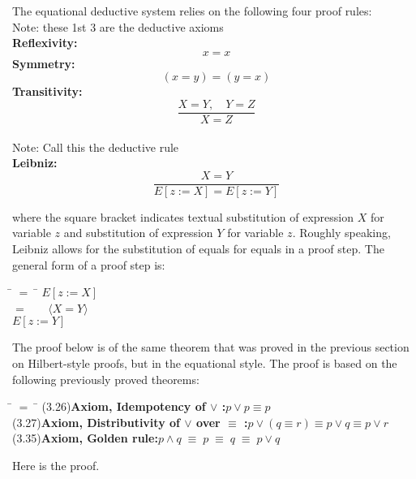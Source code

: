 \documentclass[fleqn, leqno]{article}
\newcommand{\lgap}{2pt}                             %
\newcommand{\mymathindent}{24pt}                      %
\newcommand{\equivs}{\ensuremath{\;\equiv\;}}       %
\newcommand{\Gll} {\langle}                         %
\newcommand{\Ggg} {\rangle}                         %
\newcommand{\Hint}[1]     {\ \ \ $\Gll              \mbox{#1} \Ggg$ }   %
\begin{document}
The equational deductive system relies on the following four proof rules:\\[\lgap]

Note: these 1st 3 are the deductive axioms\\
\textbf{Reflexivity:}
\[
x=x
\]
\textbf{Symmetry:}
\[
(x=y) = (y=x)
\]
\textbf{Transitivity:}
\[
\frac{X=Y, \quad Y=Z}{X=Z}
\]
\hfill\\
Note: Call this the deductive rule\\ 
\textbf{Leibniz:}
\[
\frac{X=Y}{E[z:=X]=E[z:=Y]}
\]

where the square bracket indicates textual substitution of expression $X$ for variable $z$ and substitution
of expression $Y$ for variable $z$.
Roughly speaking, Leibniz allows for the substitution of equals for equals in a proof step.
The general form of a proof step is:

\begin{tabbing}
\hspace{\mymathindent} \= $= \;$ \=  \kill
  \> \>   $E[z:=X]$\\[\lgap]
  \> $=$  \>  \Hint{$X=Y$} \\[\lgap]
  \> \>   $E[z:=Y]$
\end{tabbing}

The proof below is of the same theorem that was proved in the previous section on Hilbert-style proofs, but in the equational style.  The proof is based on the following previously proved theorems:\\

\begin{tabbing}
\hspace{\mymathindent} \= $= \;$ \=  \kill
(3.26)\>\textbf{Axiom, Idempotency of $\lor$ :}\quad $p\lor p \equiv p$\\[\lgap]
(3.27)\>\textbf{Axiom, Distributivity of $\lor$ over $\equiv$ :}\quad $p\lor (q\equiv r)\equiv p\lor q\equiv p\lor r$\\[\lgap]
(3.35)\>\textbf{Axiom, Golden rule:}\quad $p\land q\equivs p\equivs q\equivs p\lor q$\\[\lgap]
\end{tabbing}

Here is the proof.
\end{document}
